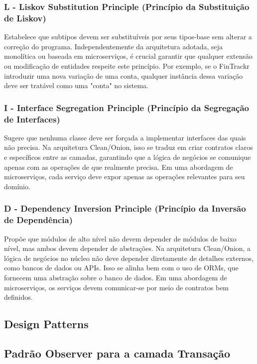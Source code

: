 \subsubsection*{L - Liskov Substitution Principle (Princípio da Substituição de Liskov)}
Estabelece que subtipos devem ser substituíveis por seus tipos-base sem alterar a correção do programa. Independentemente da arquitetura adotada, seja monolítica ou baseada em microserviços, é crucial garantir que qualquer extensão ou modificação de entidades respeite este princípio. Por exemplo, se o FinTrackr introduzir uma nova variação de uma conta, qualquer instância dessa variação deve ser tratável como uma "conta" no sistema.

\subsubsection*{I - Interface Segregation Principle (Princípio da Segregação de Interfaces)}
Sugere que nenhuma classe deve ser forçada a implementar interfaces das quais não precisa. Na arquitetura Clean/Onion, isso se traduz em criar contratos claros e específicos entre as camadas, garantindo que a lógica de negócios se comunique apenas com as operações de que realmente precisa. Em uma abordagem de microserviços, cada serviço deve expor apenas as operações relevantes para seu domínio.

\subsubsection*{D - Dependency Inversion Principle (Princípio da Inversão de Dependência)}
Propõe que módulos de alto nível não devem depender de módulos de baixo nível, mas ambos devem depender de abstrações. Na arquitetura Clean/Onion, a lógica de negócios no núcleo não deve depender diretamente de detalhes externos, como bancos de dados ou APIs. Isso se alinha bem com o uso de ORMs, que fornecem uma abstração sobre o banco de dados. Em uma abordagem de microserviços, os serviços devem comunicar-se por meio de contratos bem definidos.



\subsection{Design Patterns}

\subsection*{Padrão Observer para a camada Transação}


